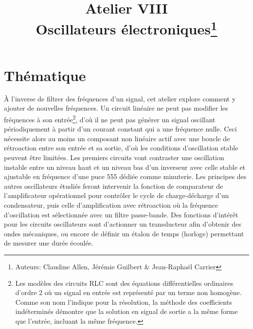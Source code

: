 \documentclass[canadien,12pt,oneside,letterpaper]{article}
\title{\textbf{Atelier VIII}\\Oscillateurs électroniques\thanks{Auteurs: Claudine Allen, Jérémie Guilbert \& Jean-Raphaël Carrier}}
\date{}
\begin{document}
\maketitle \vspace{-2.5cm}

\section{Thématique}\label{sec:objectifs}
À l’inverse de filtrer des fréquences d’un signal, cet atelier explore comment y ajouter de nouvelles fréquences. Un circuit linéaire ne peut pas modifier les fréquences à son entrée\footnote{Les modèles des circuits RLC sont des équations différentielles ordinaires d'ordre 2 où un signal en entrée est représenté par un terme non homogène. Comme son nom l'indique pour la résolution, la méthode des coefficients indéterminés démontre que la solution en signal de sortie a la même forme que l'entrée, incluant la même fréquence.}, d'où il ne peut pas générer un signal oscillant périodiquement à partir d’un courant constant qui a une fréquence nulle. Ceci nécessite alors au moins un composant non linéaire actif avec une boucle de rétroaction entre son entrée et sa sortie, d'où les conditions d'oscillation stable peuvent être limitées. Les premiers circuits vont contraster une oscillation instable entre un niveau haut et un niveau bas d'un inverseur avec celle stable et ajustable en fréquence d'une puce 555 dédiée comme minuterie. Les principes des autres oscillateurs étudiés feront intervenir la fonction de comparateur de l’amplificateur opérationnel pour contrôler le cycle de charge-décharge d’un condensateur, puis celle d’amplification avec rétroaction où la fréquence d’oscillation est sélectionnée avec un filtre passe-bande. Des fonctions d’intérêt pour les circuits oscillateurs sont d’actionner un transducteur afin d’obtenir des ondes mécaniques, ou encore de définir un étalon de temps (horloge) permettant de mesurer une durée écoulée. %

\end{document}
